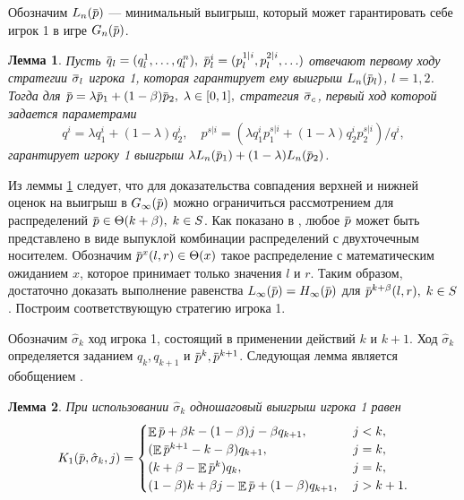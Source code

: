 \documentclass[12pt, draft]{extarticle}
\newtheorem{lemma}{Лемма}
\newcommand{\overbar}[1]%
{\mkern 1.5mu\overline{\mkern-1.3mu#1\mkern-1.3mu}\mkern 1.3mu}
\newcommand{\p}{\ensuremath{\overbar{p}}}
\newcommand{\q}{\ensuremath{\overbar{q}}}
\DeclareMathOperator{\E}{\mathbb{E}}
\newcommand{\G}[1][n]{\ensuremath{G_{#1}}}
\newcommand{\K}[1][n]{\ensuremath{K_{#1}}}
\newcommand{\High}[1][\ensuremath{\infty}]{\ensuremath{H_{#1}}}
\newcommand{\sigmav}{\ensuremath{\overbar{\sigma}}}
\newcommand{\sigmak}{\ensuremath{\hat{\sigma}}}
\newcommand{\Low}[1][\ensuremath{\infty}]{\ensuremath{L_{#1}}}
\begin{document}
Обозначим $\Low[n](\p)$ --- минимальный выигрыш, который может гарантировать
себе игрок 1 в игре $\G(\p)$.
\begin{lemma}
  \label{lower-bound:lemma:convex-combination}
  Пусть %
  $\q_l = (q^1_l, \ldots, q^n_l),$ %
  $\p^i_l = ( p^{1|i}_l, p^{2|i}_l, \ldots)$ %
  отвечают первому ходу стратегии $\sigmav_l$ игрока 1, которая гарантирует ему
  выигрыш $\Low[n](\p_l)$, $l = 1,2$. Тогда для $\p = \lambda \p_1 + (1-\beta)
  \p_2, \; \lambda \in [0, 1],$ стратегия $\sigmav_c$, первый ход которой задается
  параметрами
  \begin{equation}
    \label{lower-bound:eq:q-pi}
    q^i = \lambda q^i_1 + (1-\lambda) q^i_2, \quad
    p^{s|i} = \left(\lambda q^i_1 p^{s|i}_1 + (1-\lambda) q^i_2 p^{s|i}_2\right)/q^i,
  \end{equation}
  гарантирует игроку 1 выигрыш $\lambda \Low[n](\p_1) + (1-\lambda)
  \Low[n](\p_2)$.
\end{lemma}

Из леммы \ref{lower-bound:lemma:convex-combination} следует, что для
доказательства совпадения верхней и нижней оценок на выигрыш в $\G[\infty](\p)$
можно ограничиться рассмотрением для распределений $\p \in \Theta(k + \beta), \;
k \in S$. Как показано в \cite{bib:domansky11}, любое $\p$ может быть
представлено в виде выпуклой комбинации распределений с двухточечным носителем.
Обозначим $\p^x(l, r) \in \Theta(x)$ такое распределение с математическим
ожиданием $x$, которое принимает только значения $l$ и $r$. Таким образом,
достаточно доказать выполнение равенства $\Low(\p) = \High(\p)$ для
$\p^{k+\beta}(l,r), \; k \in S$. Построим соответствующую стратегию игрока 1.

Обозначим $\sigmak_k$ ход игрока 1, состоящий в применении действий $k$ и $k+1$.
Ход $\sigmak_k$ определяется заданием $q_k, q_{k+1}$ и $\p^k, \p^{k+1}$.
Следующая лемма является обобщением \cite[Утверждение 2]{bib:pyanykh16}.
\begin{lemma}
  \label{lower-bound:lemma:stage-payoff}
  При использовании $\sigmak_k$ одношаговый выигрыш игрока 1 равен
  \begin{equation*}
    \K[1](\p, \sigmak_k, j) = \begin{cases}
      \E \p + \beta k - (1-\beta) j - \beta q_{k+1}, &\; j < k, \\
      (\E \p^{k+1} - k - \beta) q_{k+1}, &\; j = k, \\
      (k + \beta - \E \p^k) q_k, &\; j = k, \\
      (1-\beta) k + \beta j - \E \p + (1-\beta) q_{k+1}, &\; j > k + 1.
    \end{cases}
  \end{equation*}
\end{lemma}
\end{document}
